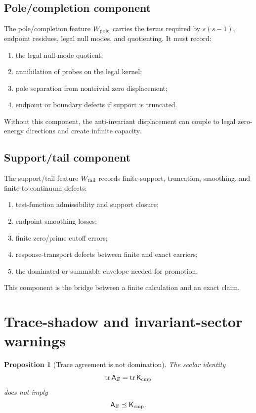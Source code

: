 \documentclass[11pt]{article}
\newtheorem{proposition}[theorem]{Proposition}
\newcommand{\K}{\mathsf K}
\newcommand{\A}{\mathsf A}
\newcommand{\tr}{\operatorname{tr}}
\begin{document}
\subsection{Pole/completion component}
The pole/completion feature \(W_{\rm pole}\) carries the terms required by \(s(s-1)\), endpoint residues, legal null modes, and quotienting. It must record:
\begin{enumerate}[label=\textup{Po\arabic*.}]
  \item the legal null-mode quotient;
  \item annihilation of probes on the legal kernel;
  \item pole separation from nontrivial zero displacement;
  \item endpoint or boundary defects if support is truncated.
\end{enumerate}
Without this component, the anti-invariant displacement can couple to legal zero-energy directions and create infinite capacity.

\subsection{Support/tail component}
The support/tail feature \(W_{\rm tail}\) records finite-support, truncation, smoothing, and finite-to-continuum defects:
\begin{enumerate}[label=\textup{Ta\arabic*.}]
  \item test-function admissibility and support closure;
  \item endpoint smoothing losses;
  \item finite zero/prime cutoff errors;
  \item response-transport defects between finite and exact carriers;
  \item the dominated or summable envelope needed for promotion.
\end{enumerate}
This component is the bridge between a finite calculation and an exact claim.

\section{Trace-shadow and invariant-sector warnings}

\begin{proposition}[Trace agreement is not domination]
The scalar identity
\[
  \tr \A_Z=\tr \K_{\rm cmp}
\]
does not imply
\[
  \A_Z\preceq\K_{\rm cmp}.
\]
\end{proposition}
\end{document}
